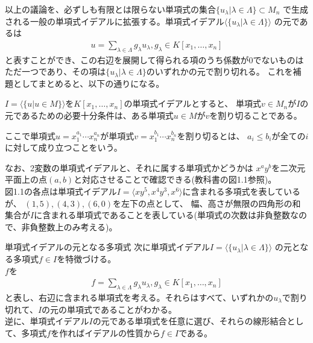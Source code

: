 \begin{frame}
	以上の議論を、必ずしも有限とは限らない単項式の集合$\{ u_{\lambda} | \lambda \in \Lambda \} \subset M_n$
	で生成される一般の単項式イデアルに拡張する。単項式イデアル$\langle \{ u_{\lambda} | \lambda \in \Lambda \} \rangle$
	の元であるは
	\begin{align*}
		u = \sum_{\lambda \in \Lambda} g_{\lambda} u_{\lambda}, g_{\lambda} \in K[x_1, \ldots, x_n]
	\end{align*}
	と表すことができ、この右辺を展開して得られる項のうち係数が0でないものはただ一つであり、その項は$\{ u_{\lambda} | \lambda \in \Lambda \}$のいずれかの元で割り切れる。
	これを補題としてまとめると、以下の通りになる。
	\begin{lemma}
		\label{lem:single_monomial}
		$I = \langle \{u | u \in M\} \rangle$を$K[x_1, \ldots, x_n]$の単項式イデアルとすると、
		単項式$v \in M_n$が$I$の元であるための必要十分条件は、ある単項式$u \in M$が$v$を割り切ることである。
	\end{lemma}
	ここで単項式$u=x_1^{a_1} \cdots x_n^{a_n}$が単項式$v=x_1^{b_1} \cdots x_n^{b_n}$を割り切るとは、
	$a_i \leq b_i$が全ての$i$に対して成り立つことをいう。

\end{frame}

\begin{frame}
	なお、2変数の単項式イデアルと、それに属する単項式かどうかは
	$x^a y^b$を二次元平面上の点$(a, b)$と対応させることで確認できる(教科書の図1.1参照)。\\
	図1.1の各点は単項式イデアル$I = \langle xy^5, x^4y^3, x^6 \rangle$に含まれる多項式を表しているが、
	$(1,5), (4,3), (6,0)$を左下の点として、
	幅、高さが無限の四角形の和集合が$I$に含まれる単項式であることを表している(単項式の次数は非負整数なので、非負整数上のみ考える)。
\end{frame}

\begin{frame} {単項式イデアルの元となる多項式}
	次に単項式イデアル$I=\langle \{ u_{\lambda} | \lambda \in \Lambda \} \rangle$
	の元となる多項式$f \in I$を特徴づける。\\
	$f$を
	\begin{align*}
		f = \sum_{\lambda \in \Lambda} g_{\lambda} u_{\lambda}, g_{\lambda} \in K[x_1, \ldots, x_n]
	\end{align*}
	と表し、右辺に含まれる単項式を考える。それらはすべて、いずれかの$u_{\lambda}$で割り切れて、$I$の元の単項式であることがわかる。\\
	逆に、単項式イデアル$I$の元である単項式を任意に選び、それらの線形結合として、多項式$f$を作ればイデアルの性質から$f \in I$である。\\

\end{frame}

